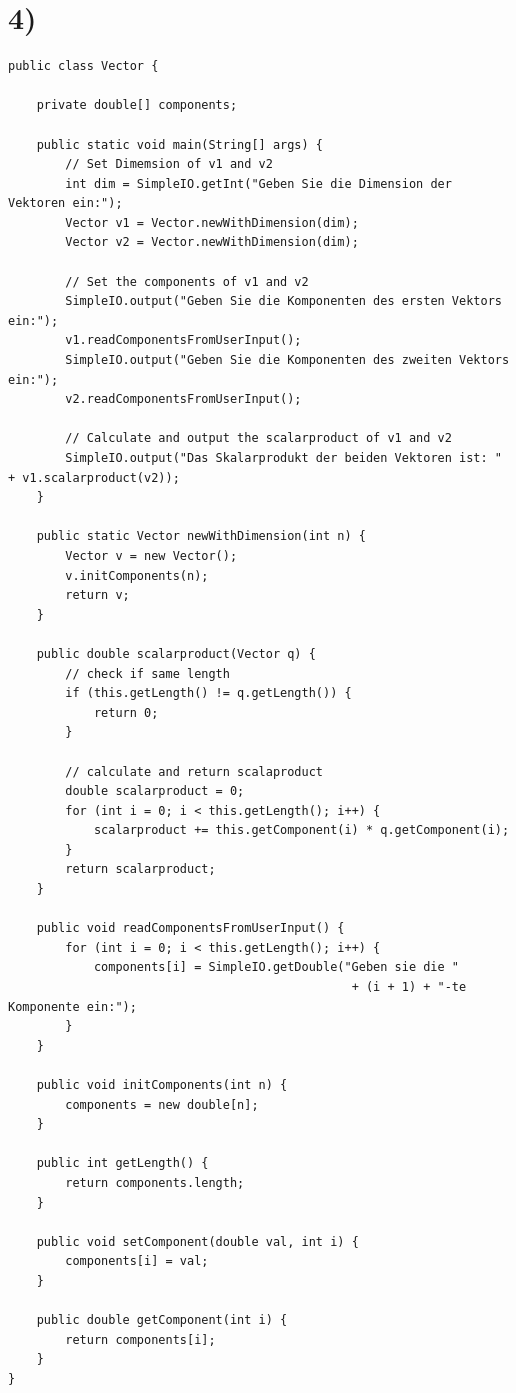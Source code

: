 \documentclass[12pt]{article}
\begin{document}
\section{4)}
\begin{lstlisting}
public class Vector {

    private double[] components;

    public static void main(String[] args) {
        // Set Dimemsion of v1 and v2
        int dim = SimpleIO.getInt("Geben Sie die Dimension der Vektoren ein:");
        Vector v1 = Vector.newWithDimension(dim);
        Vector v2 = Vector.newWithDimension(dim);

        // Set the components of v1 and v2
        SimpleIO.output("Geben Sie die Komponenten des ersten Vektors ein:");
        v1.readComponentsFromUserInput();
        SimpleIO.output("Geben Sie die Komponenten des zweiten Vektors ein:");
        v2.readComponentsFromUserInput();

        // Calculate and output the scalarproduct of v1 and v2
        SimpleIO.output("Das Skalarprodukt der beiden Vektoren ist: " + v1.scalarproduct(v2));
    }

    public static Vector newWithDimension(int n) {
        Vector v = new Vector();
        v.initComponents(n);
        return v;
    }

    public double scalarproduct(Vector q) {
        // check if same length
        if (this.getLength() != q.getLength()) {
            return 0;
        }

        // calculate and return scalaproduct
        double scalarproduct = 0;
        for (int i = 0; i < this.getLength(); i++) {
            scalarproduct += this.getComponent(i) * q.getComponent(i);
        }
        return scalarproduct;
    }

    public void readComponentsFromUserInput() {
        for (int i = 0; i < this.getLength(); i++) {
            components[i] = SimpleIO.getDouble("Geben sie die "
                                                + (i + 1) + "-te Komponente ein:");
        }
    }

    public void initComponents(int n) {
        components = new double[n];
    }

    public int getLength() {
        return components.length;
    }

    public void setComponent(double val, int i) {
        components[i] = val;
    }

    public double getComponent(int i) {
        return components[i];
    }
}
\end{lstlisting}
\end{document}
